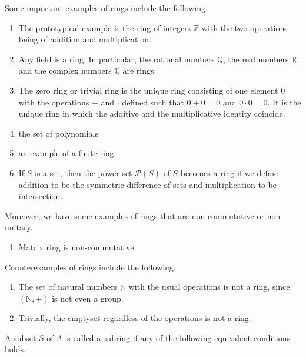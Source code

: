 %
%
%
\begin{exmbox}
    \begin{example}
        Some important examples of rings include the following.
        \begin{enumerate}
            \item The prototypical example is the ring of integers \(\mathbb{Z}\) with the two operations being of addition and multiplication.
            \item Any field is a ring. In particular, the rational numbers \(\mathbb{Q}\), the real numbers \(\mathbb{R}\), and the complex numbers \(\mathbb{C}\) are rings.
            \item The zero ring or trivial ring is the unique ring consisting of one element \(0\) with the operations \(+\) and \(\cdot\) defined such that \(0 + 0 = 0\) and \(0 \cdot 0 = 0\). It is the unique ring in which the additive and the multiplicative identity coincide.
            \item the set of polynomials
            \item an example of a finite ring
            \item If \(S\) is a set, then the power set \(\mathcal{P}(S)\) of \(S\) becomes a ring if we define addition to be the symmetric difference of sets and multiplication to be intersection.
        \end{enumerate}
    \end{example}
\end{exmbox}
%
%
%
\begin{example}
    Moreover, we have some examples of rings that are non-commutative or non-unitary.
    \begin{enumerate}
        \item Matrix ring is non-commutative
    \end{enumerate}
\end{example}
%
%
%
\begin{example}
    Counterexamples of rings include the following.
    \begin{enumerate}
        \item The set of natural numbers \(\mathbb{N}\) with the usual operations is not a ring, since \((\mathbb{N}, +)\) is not even a group.
        \item Trivially, the emptyset regardless of the operations is not a ring.
    \end{enumerate}
\end{example}
%
%
%
\begin{defbox}
    \begin{definition}[Subring]
        A subset \(S\) of \(A\) is called a subring if any of the following equivalent conditions holds.
    \end{definition}
\end{defbox}
